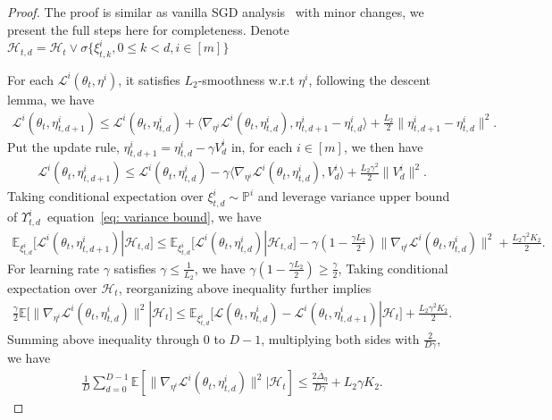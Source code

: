 \documentclass[twoside]{article} %
\def\eqref#1{equation~\ref{#1}}
\theoremstyle{plain}
\theoremstyle{definition}
\theoremstyle{remark}
\newcommand{\fL}{\mathcal{L}}
\newcommand{\calH}{\mathcal{H}}
\begin{document}
\begin{proof}
    The proof is similar as vanilla SGD analysis~\citep{lanSGD} with minor changes, we present the full steps here for completeness. Denote $\calH_{t,d} = \calH_t \vee \sigma\{\xi_{t,k}^i, 0\leq k<d,i\in[m] \}$
    
    For each $\fL^i({\theta}_t, \eta^{i})$, it satisfies $L_2$-smoothness w.r.t $\eta^i$, following the descent lemma, we have
    \begin{align}
        \fL^i({\theta}_t, \eta^i_{t,d+1})\leq \fL^i({\theta}_t, \eta^i_{t,d}) + \langle\nabla_{\eta^i}\fL^i({\theta}_t, \eta^i_{t,d}),\eta^i_{t,d+1}-\eta^i_{t,d} \rangle + \frac{L_2}{2} \|\eta^i_{t,d+1}-\eta^i_{t,d} \|^2.\nonumber
    \end{align}
    Put the update rule, $\eta^i_{t,d+1}=\eta^i_{t,d} - \gamma V^i_d$ in, for each $i\in[m]$, we then have
    \begin{align}
        \fL^i({\theta}_t, \eta^i_{t,d+1})\leq \fL^i({\theta}_t, \eta^i_{t,d}) - \gamma\langle\nabla_{\eta^i}\fL^i({\theta}_t, \eta^i_{t,d}),V^i_{d} \rangle + \frac{L_2\gamma^2}{2} \|V^i_{d} \|^2.\nonumber
    \end{align}
Taking conditional expectation over $\xi^{i}_{t,d}\sim \mathbb{P}^i$ and leverage variance upper bound of $\Upsilon_{t,d}^i$~\eqref{eq: variance bound}, we have
\begin{align}
    \mathbb{E}_{\xi^{i}_{t,d}}\big[\fL^i({\theta}_t, \eta^i_{t,d+1})|\calH_{t,d}\big]\leq \mathbb{E}_{\xi^{i}_{t,d}}\big[ \fL^i({\theta}_t, \eta^i_{t,d})|\calH_{t,d}\big] - \gamma(1-\frac{\gamma L_2}{2}) \|\nabla_{\eta^i} \fL^i({\theta}_t, \eta^i_{t,d}) \|^2 + \frac{L_2\gamma^2K_2}{2}. \nonumber
\end{align}
For learning rate $\gamma$ satisfies $\gamma \leq \frac{1}{L_2}$, we have 
$\gamma(1-\frac{\gamma L_2}{2})\geq \frac{\gamma}{2}$,
Taking conditional expectation over $\calH_t$, reorganizing above inequality  further implies
\begin{align}
   \frac{\gamma}{2} \mathbb{E}[\|\nabla_{\eta^i}\fL^i({\theta}_t, \eta^i_{t,d}) \|^2|\calH_t] \leq \mathbb{E}_{\xi^i_{t,d}}\big[\fL({\theta}_t, \eta^i_{t,d}) - \fL^i({\theta}_t, \eta^i_{t,d+1}) |\calH_t\big] + \frac{L_2\gamma^2K_2}{2}.\nonumber
\end{align}
Summing above inequality through $0$ to $D-1$, multiplying both sides with $\frac{2}{D\gamma}$, we have
\begin{align}
    \frac{1}{D} \sum_{d=0}^{D-1}\mathbb{E}[\|\nabla_{\eta^i} \fL^i({\theta}_t, \eta^i_{t,d})\|^2|\calH_t] \leq \frac{2\overline{\Delta}_{\eta}}{D\gamma}+L_2\gamma K_2.\nonumber

\end{align}
\end{proof}
\end{document}
